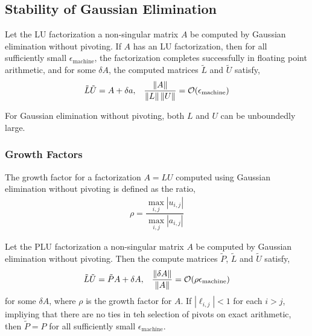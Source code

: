 \documentclass[12pt]{article}
\begin{document}
\subsection{Stability of Gaussian Elimination}

\begin{theorem}
Let the LU factorization a non-singular matrix \( A \) be computed by Gaussian elimination without pivoting. If \( A \) has an LU factorization, then for all sufficiently small \( \epsilon_{\text{machine}} \), the factorization completes successfully in floating point arithmetic, and for some \( \delta A \), the computed matrices \( \tilde{L} \) and \( \tilde{U} \) satisfy,
\begin{align*}
    \tilde{L}\tilde{U} = A + \delta a, && \dfrac{\left\lVert A\right\rVert}{\left\lVert L\right\rVert\left\lVert U\right\rVert} = \mathcal{O}(\epsilon_\text{machine})
\end{align*}
\end{theorem}

For Gaussian elimination without pivoting, both \( L \) and \( U \) can be unboundedly large.

\subsubsection{Growth Factors}

\begin{definition}
The growth factor for a factorization \( A = LU \) computed using Gaussian elimination without pivoting is defined as the ratio,
\begin{align*}
    \rho = \dfrac{\max_{i,j} |u_{i,j}|}{\max_{i,j} |a_{i,j}|}
\end{align*}
\end{definition}

\begin{theorem}
Let the PLU factorization a non-singular matrix \( A \) be computed by Gaussian elimination without pivoting. Then the compute matrices \( \tilde{P} \), \( \tilde{L} \) and \( \tilde{U} \) satisfy,
\begin{align*}
    \tilde{L}\tilde{U} = \tilde{P}A + \delta A, && \dfrac{\left\lVert\delta A\right\rVert}{\left\lVert A\right\rVert} = \mathcal{O}(\rho\epsilon_\text{machine})
\end{align*}
for some \( \delta A \), where \( \rho \) is the growth factor for \( A \). If \( |\ell_{i,j}| < 1 \) for each \( i > j \), impliying that there are no ties in teh selection of pivots on exact arithmetic, then \( \tilde{P} = P \) for all sufficiently small \( \epsilon_\text{machine} \).
\end{theorem}
\end{document}
